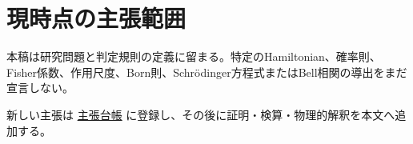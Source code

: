 \documentclass[11pt,a4paper,openany]{report}
\numberwithin{equation}{chapter}
\theoremstyle{definition}
\theoremstyle{remark}
\begin{document}
\section{現時点の主張範囲}\label{ux73feux6642ux70b9ux306eux4e3bux5f35ux7bc4ux56f2}

本稿は研究問題と判定規則の定義に留まる。特定のHamiltonian、確率則、Fisher係数、作用尺度、Born則、Schrödinger方程式またはBell相関の導出をまだ宣言しない。

新しい主張は \href{../rewrite/CLAIM_LEDGER.md}{主張台帳} に登録し、その後に証明・検算・物理的解釈を本文へ追加する。
\end{document}
